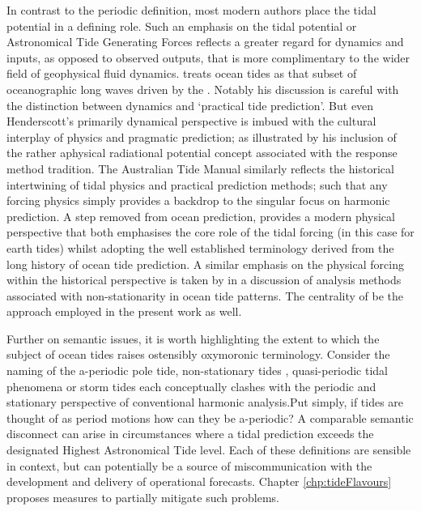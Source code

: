 In contrast to the periodic definition, most modern authors place the tidal potential in a defining role. Such an emphasis on the tidal potential or Astronomical Tide Generating Forces \ATGP{} reflects a greater regard for dynamics and inputs, as opposed to observed outputs, that is more complimentary to the wider field of geophysical fluid dynamics.  
\citep{Hendershott:1981ub} treats ocean tides as that subset of oceanographic long waves driven by the \ATGP{}.  Notably his discussion is careful with the distinction between dynamics and `practical tide prediction'. But even Henderscott's primarily dynamical perspective is imbued with the cultural interplay of physics and pragmatic prediction; as illustrated by his inclusion of the rather aphysical radiational potential concept associated with the \citep{Munk:1966ts} response method tradition.
The Australian Tide Manual \citep{PCTMSL-sp9} similarly reflects the historical intertwining of tidal physics and practical prediction methods; such that any forcing physics simply provides a backdrop to the singular focus on harmonic prediction.   
A step removed from ocean prediction, \citep{agnew2015} provides a modern physical perspective that both emphasises the core role of the tidal forcing (in this case for earth tides) whilst adopting the well established terminology derived from the long history of ocean tide prediction. A similar emphasis on the physical forcing within the historical perspective is taken by \citep{Flinchem:2000kp} in a  discussion of analysis methods associated with non-stationarity in ocean tide patterns.
The centrality of \ATGP{} be the approach employed in the present work as well.


Further on semantic issues, it is worth highlighting the extent to which the subject of ocean tides raises ostensibly oxymoronic terminology.  
Consider the naming of the a-periodic pole tide, non-stationary tides \citep{Ray:2011tj}, quasi-periodic tidal phenomena \citep{Flinchem:2000kp} or storm tides \citep{Horsburgh:2008gw} each conceptually clashes with the periodic and stationary perspective of conventional harmonic analysis.Put simply, if tides are thought of as period motions how can they be a-periodic?  
A comparable semantic disconnect can arise in circumstances where a tidal prediction exceeds the designated Highest Astronomical Tide level.   
Each of these definitions are sensible in context, but can potentially be a source of miscommunication with the development and delivery of operational forecasts.    Chapter \ref{chp:tideFlavours} proposes measures to partially mitigate such problems.


